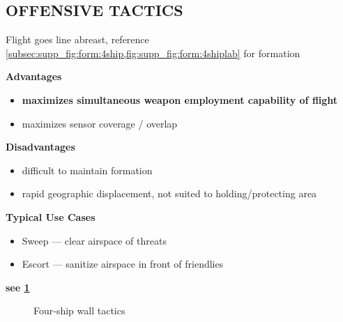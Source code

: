 
\clearpage

\subsection{OFFENSIVE TACTICS}

\begin{tcoloritemize}
    \blueitem[Wall]
    Flight goes line abreast, 
    reference \cref{subsec:supp_fig:form:4ship,fig:supp_fig:form:4shiplab}
    for formation

    \bigskip
    \textbf{Advantages}
    \begin{itemize}
        \item \textbf{maximizes simultaneous weapon employment capability of flight}
        \item maximizes sensor coverage / overlap
    \end{itemize}

    \textbf{Disadvantages}
    \begin{itemize}
        \item difficult to maintain formation
        \item rapid geographic displacement, 
        not suited to holding/protecting area
    \end{itemize}
    
    \textbf{Typical Use Cases}
    \begin{itemize}
        \item Sweep --- clear airspace of threats
        \item Escort --- sanitize airspace in front of friendlies
    \end{itemize}
    \hfill\textbf{see \cref{fig:ttp_aa:4ship:offensive:wall}}
\end{tcoloritemize}

\begin{figure}[htbp]
    \centering
    \caption{Four-ship wall tactics}%
    \label{fig:ttp_aa:4ship:offensive:wall}
\end{figure}


